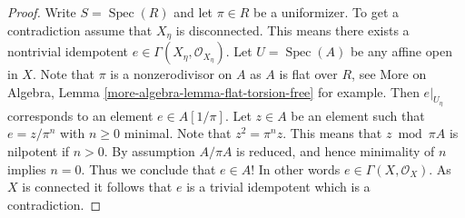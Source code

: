 \documentclass[10pt,a4paper]{amsart}
\theoremstyle{plain}
\theoremstyle{definition}
\theoremstyle{remark}
\numberwithin{equation}{subsection}
\def\Spec{\mathop{\mathrm{Spec}}}
\begin{document}
\begin{proof}
Write $S = \Spec(R)$ and let $\pi \in R$ be a uniformizer.
To get a contradiction assume that $X_\eta$ is disconnected.
This means there exists a nontrivial idempotent
$e \in \Gamma(X_\eta, \mathcal{O}_{X_\eta})$.
Let $U = \Spec(A)$ be any affine open in $X$.
Note that $\pi$ is a nonzerodivisor on $A$ as $A$ is flat over $R$, see
More on Algebra, Lemma \ref{more-algebra-lemma-flat-torsion-free}
for example. Then $e|_{U_\eta}$ corresponds to an element $e \in A[1/\pi]$.
Let $z \in A$ be an element such that $e = z/\pi^n$ with $n \geq 0$ minimal.
Note that $z^2 = \pi^nz$. This means that $z \bmod \pi A$ is nilpotent
if $n > 0$. By assumption $A/\pi A$ is reduced, and hence minimality of
$n$ implies $n = 0$. Thus we conclude that $e \in A$! In other words
$e \in \Gamma(X, \mathcal{O}_X)$. As $X$ is connected it follows
that $e$ is a trivial idempotent which is a contradiction.
\end{proof}
\end{document}
